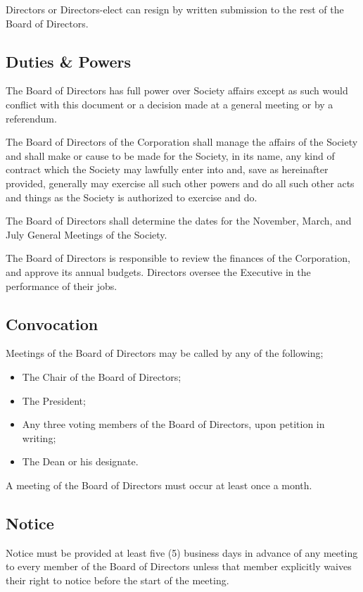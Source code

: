 Directors or Directors-elect can resign by written submission to the rest of
the Board of Directors. 

\subsection{Duties \& Powers}
The Board of Directors has full power over Society affairs except as such would 
conflict with this document or a decision made at a general meeting or by a 
referendum.

The Board of Directors of the Corporation shall manage the affairs of the 
Society and shall make or cause to be made for the Society, in its name, any 
kind of contract which the Society may lawfully enter into and, save as 
hereinafter provided, generally may exercise all such other powers and do all 
such other acts and things as the Society is authorized to exercise and do.

The Board of Directors shall determine the dates for the November, March, and July 
General Meetings of the Society.

The Board of Directors is responsible to review the finances of the Corporation, and approve 
its annual budgets. Directors oversee the Executive in the performance of their jobs.

\subsection{Convocation}
Meetings of the Board of Directors may be called by any of the following;
\begin{itemize}
  \item The Chair of the Board of Directors;
  \item The President;
  \item Any three voting members of the Board of Directors, upon petition in writing;
  \item The Dean or his designate.
\end{itemize}

A meeting of the Board of Directors must occur at least once a month.

\subsection{Notice}
Notice must be provided at least five (5) business days in advance of any meeting to every
member of the Board of Directors unless that member explicitly waives their right to
notice before the start of the meeting.

